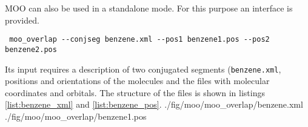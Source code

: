 MOO can also be used in a standalone mode. For this purpose an interface \overlap is provided. 
\begin{verbatim}
 moo_overlap --conjseg benzene.xml --pos1 benzene1.pos --pos2 benzene2.pos
\end{verbatim}
Its input requires a description of two conjugated segments (\texttt{benzene.xml}, positions and orientations of the molecules and the files with molecular coordinates and orbitals. The structure of the files is shown in listings \ref{list:benzene_xml} and  \ref{list:benzene_pos}.
\vskip 0.1cm
 {./fig/moo/moo_overlap/benzene.xml}
\vskip 0.1cm
 {./fig/moo/moo_overlap/benzene1.pos}
